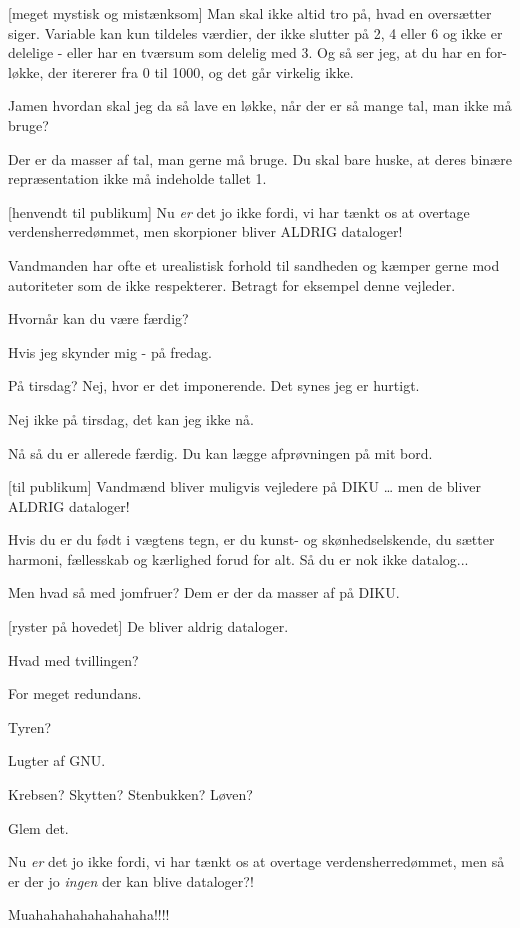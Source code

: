 \documentclass[a4paper,11pt]{article}
\begin{document}
\begin{sketch}
 [meget mystisk og mistænksom] Man skal ikke altid tro på, hvad en oversætter siger. Variable kan kun tildeles værdier, der ikke slutter på 2, 4 eller 6 og ikke er delelige - eller har en tværsum som delelig med 3. Og så ser jeg, at du har en for-løkke, der itererer fra 0 til 1000, og det går virkelig ikke.

 Jamen hvordan skal jeg da så lave en løkke, når der er så mange tal, man ikke må bruge?

 Der er da masser af tal, man gerne må bruge. Du skal bare huske, at deres binære repræsentation ikke må indeholde tallet 1.

 [henvendt til publikum] Nu \textit{er} det jo ikke fordi, vi har tænkt os at overtage verdensherredømmet, men skorpioner bliver ALDRIG dataloger!

 Vandmanden har ofte et urealistisk forhold til sandheden og kæmper gerne mod autoriteter som de ikke respekterer. Betragt for eksempel denne vejleder.

 Hvornår kan du være færdig?

 Hvis jeg skynder mig - på fredag.

 På tirsdag? Nej, hvor er det imponerende. Det synes jeg er hurtigt.

 Nej ikke på tirsdag, det kan jeg ikke nå.

 Nå så du er allerede færdig. Du kan lægge afprøvningen på mit bord.

 [til publikum] Vandmænd bliver muligvis vejledere på DIKU \ldots
{} men de bliver ALDRIG dataloger!

 Hvis du er du født i vægtens tegn, er du kunst- og skønhedselskende, du sætter harmoni, fællesskab og kærlighed forud for alt.  Så du er nok ikke datalog...

 Men hvad så med jomfruer? Dem er der da masser af på DIKU.

 [ryster på hovedet] De bliver aldrig dataloger.

 Hvad med tvillingen?

 For meget redundans.

 Tyren?

 Lugter af GNU.

 Krebsen? Skytten? Stenbukken? Løven?

 Glem det.

 Nu \textit{er} det jo ikke fordi, vi har tænkt os at overtage verdensherredømmet, men så er der jo \textit{ingen} der kan blive dataloger?!


 Muahahahahahahahaha!!!!


\end{sketch}
\end{document}
